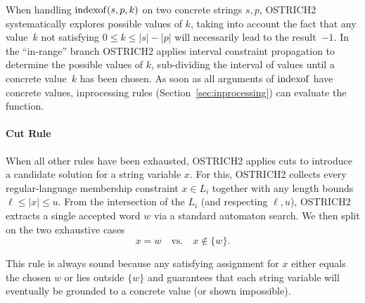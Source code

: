 When handling $\operatorname{indexof}(s,p,k)$ on two concrete strings $s,p$,
OSTRICH2 systematically explores possible values of $k$, taking into
account the fact that any value~$k$ not satisfying
$ 0 \le k \le |s| - |p| $ will necessarily lead to the result~$-1$.
In the ``in-range'' branch OSTRICH2 applies interval constraint
propagation to determine the possible values of $k$, sub-dividing the
interval of values until a concrete value~$k$ has been chosen. As soon
as all arguments of $\operatorname{indexof}$ have concrete values, inprocessing
rules (Section~\ref{sec:inprocessing}) can evaluate the function.

\paragraph{Cut Rule}
When all other rules have been exhausted, OSTRICH2 applies cuts to
introduce a candidate solution for a string variable $x$.  For this, OSTRICH2 collects every regular‐language membership constraint $x \in L_i$
together with any length bounds $\ell\le|x|\le u$.  From the intersection of the $L_i$ (and respecting $\ell,u$), OSTRICH2 extracts a single accepted word $w$ via a standard automaton search.  We then split on the two exhaustive cases
%
\[
x = w
\quad\text{vs.}\quad
x \notin \{w\}.
\]

This rule is always sound because any satisfying assignment for $x$ either equals the chosen $w$ or lies outside $\{w\}$ and guarantees that each string variable will eventually be grounded to a concrete value (or shown impossible).

